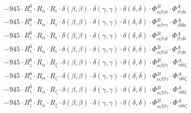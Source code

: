 \documentclass{article}
\begin{document}
\begin{subequations}
\begin{gather}
\begin{array}{c}
 \\[0.2em] 		 - 945 \cdot R_{z}^{6} \cdot R_{\alpha{}} \cdot R_{\epsilon{}} \cdot \delta{}\left(\beta{}, \beta{}\right) \cdot \delta{}\left(\gamma{}, \gamma{}\right) \cdot \delta{}\left(\delta{}, \delta{}\right) \cdot \Phi{}^{B}_{\alpha{}\beta{}\gamma{}\delta{}} \cdot \Phi{}^{A}_{\beta{}\gamma{}\delta{}\epsilon{}} 
 \\[0.2em] 		 - 945 \cdot R_{z}^{6} \cdot R_{\alpha{}} \cdot R_{\epsilon{}} \cdot \delta{}\left(\beta{}, \beta{}\right) \cdot \delta{}\left(\gamma{}, \gamma{}\right) \cdot \delta{}\left(\delta{}, \delta{}\right) \cdot \Phi{}^{B}_{\alpha{}\beta{}\gamma{}\gamma{}} \cdot \Phi{}^{A}_{\beta{}\delta{}\delta{}\epsilon{}} 
 \\[0.2em] 		 - 945 \cdot R_{z}^{6} \cdot R_{\alpha{}} \cdot R_{\epsilon{}} \cdot \delta{}\left(\beta{}, \beta{}\right) \cdot \delta{}\left(\gamma{}, \gamma{}\right) \cdot \delta{}\left(\delta{}, \delta{}\right) \cdot \Phi{}^{B}_{\alpha{}\beta{}\gamma{}\delta{}} \cdot \Phi{}^{A}_{\beta{}\gamma{}\delta{}\epsilon{}} 
 \\[0.2em] 		 - 945 \cdot R_{z}^{6} \cdot R_{\alpha{}} \cdot R_{\epsilon{}} \cdot \delta{}\left(\beta{}, \beta{}\right) \cdot \delta{}\left(\gamma{}, \gamma{}\right) \cdot \delta{}\left(\delta{}, \delta{}\right) \cdot \Phi{}^{B}_{\alpha{}\beta{}\gamma{}\delta{}} \cdot \Phi{}^{A}_{\beta{}\gamma{}\delta{}\epsilon{}} 
 \\[0.2em] 		 - 945 \cdot R_{z}^{6} \cdot R_{\alpha{}} \cdot R_{\zeta{}} \cdot \delta{}\left(\beta{}, \beta{}\right) \cdot \delta{}\left(\gamma{}, \gamma{}\right) \cdot \delta{}\left(\delta{}, \delta{}\right) \cdot \Phi{}^{B}_{\alpha{}\beta{}\beta{}\gamma{}} \cdot \Phi{}^{A}_{\gamma{}\delta{}\delta{}\zeta{}} 
 \\[0.2em] 		 - 945 \cdot R_{z}^{6} \cdot R_{\alpha{}} \cdot R_{\zeta{}} \cdot \delta{}\left(\beta{}, \beta{}\right) \cdot \delta{}\left(\gamma{}, \gamma{}\right) \cdot \delta{}\left(\delta{}, \delta{}\right) \cdot \Phi{}^{B}_{\alpha{}\beta{}\beta{}\gamma{}} \cdot \Phi{}^{A}_{\gamma{}\delta{}\delta{}\zeta{}} 
 \\[0.2em] 		 - 945 \cdot R_{z}^{6} \cdot R_{\alpha{}} \cdot R_{\zeta{}} \cdot \delta{}\left(\beta{}, \beta{}\right) \cdot \delta{}\left(\gamma{}, \gamma{}\right) \cdot \delta{}\left(\delta{}, \delta{}\right) \cdot \Phi{}^{B}_{\alpha{}\beta{}\beta{}\gamma{}} \cdot \Phi{}^{A}_{\gamma{}\delta{}\delta{}\zeta{}} 
 \\[0.2em] 		 - 945 \cdot R_{z}^{6} \cdot R_{\alpha{}} \cdot R_{\zeta{}} \cdot \delta{}\left(\beta{}, \beta{}\right) \cdot \delta{}\left(\gamma{}, \gamma{}\right) \cdot \delta{}\left(\delta{}, \delta{}\right) \cdot \Phi{}^{B}_{\alpha{}\beta{}\beta{}\gamma{}} \cdot \Phi{}^{A}_{\gamma{}\delta{}\delta{}\zeta{}} 

\end{array}
\end{gather}
\end{subequations}
\end{document}
